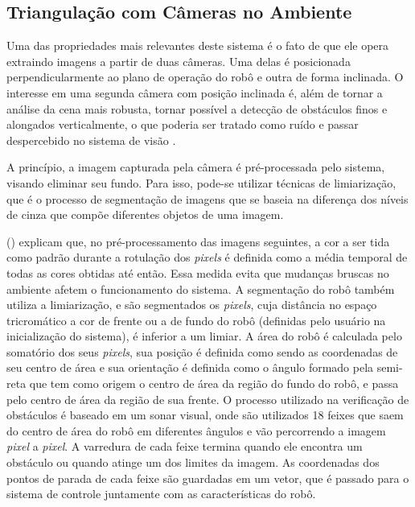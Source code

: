 \subsection{Triangulação com Câmeras no Ambiente}
\label{subsec:triangulacao}

Uma das propriedades mais relevantes deste sistema é o fato de que ele opera extraindo imagens a partir de duas câmeras. Uma delas é posicionada perpendicularmente ao plano de operação do robô e outra de forma inclinada. O interesse em uma segunda câmera com posição inclinada é, além de tornar a análise da cena mais robusta, tornar possível a detecção de obstáculos finos e alongados verticalmente, o que poderia ser tratado como ruído e passar despercebido no sistema de visão \cite{andrade2006sistema}.

A princípio, a imagem capturada pela câmera é pré-processada pelo sistema, visando eliminar seu fundo. Para isso, pode-se utilizar técnicas de limiarização, que é o processo de segmentação de imagens que se baseia na diferença dos níveis de cinza que compõe diferentes objetos de uma imagem.

\citeauthor{andrade2006sistema} (\citeyear{andrade2006sistema}) explicam que, no pré-processamento das imagens seguintes, a cor a ser tida como padrão durante a rotulação dos \textit{pixels} é definida como a média temporal de todas as cores obtidas até então. Essa medida evita que mudanças bruscas no ambiente afetem o funcionamento do sistema. A segmentação do robô também utiliza a limiarização, e são segmentados os \textit{pixels}, cuja distância no espaço tricromático a cor de frente ou a de fundo do robô (definidas pelo usuário na inicialização do sistema), é inferior a um limiar. A área do robô é calculada pelo somatório dos seus \textit{pixels}, sua posição é definida como sendo as coordenadas de seu centro de área e sua orientação é definida como o ângulo formado pela semi-reta que tem como origem o centro de área da região do fundo do robô, e passa pelo centro de área da região de sua frente. O processo utilizado na verificação de obstáculos é baseado em um sonar visual, onde são utilizados 18 feixes que saem do centro de área do robô em diferentes ângulos e vão percorrendo a imagem \textit{pixel} a \textit{pixel}. A varredura de cada feixe termina quando ele encontra um obstáculo ou quando atinge um dos limites da imagem. As coordenadas dos pontos de parada de cada feixe são guardadas em um vetor, que é passado para o sistema de controle juntamente com as características do robô.

